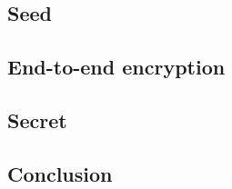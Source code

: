 
\subsection{Seed}
\label{sec:8-seed}

\clearpage

\subsection{End-to-end encryption}
\label{sec:8-end-to-end}

\clearpage

\subsection{Secret}
\label{sec:8-secret}

\clearpage

\subsection{Conclusion}
\label{sec:8-conc}

